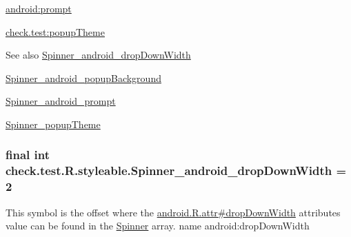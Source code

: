 {\ttfamily \hyperlink{classcheck_1_1test_1_1_r_1_1styleable_af103d6b67bae0598aa2d77310b3aab0d}{android\+:prompt}}

{\ttfamily \hyperlink{classcheck_1_1test_1_1_r_1_1styleable_a119cd6dc9855dc91a0bd24dd52b9ee01}{check.\+test\+:popup\+Theme}}

\begin{DoxySeeAlso}{See also}
\hyperlink{classcheck_1_1test_1_1_r_1_1styleable_a0f8793af1c217d7771c8d1860fa6a1e8}{Spinner\+\_\+android\+\_\+drop\+Down\+Width} 

\hyperlink{classcheck_1_1test_1_1_r_1_1styleable_af3a17f8a0e3b61c605894eed3a35f9a4}{Spinner\+\_\+android\+\_\+popup\+Background} 

\hyperlink{classcheck_1_1test_1_1_r_1_1styleable_af103d6b67bae0598aa2d77310b3aab0d}{Spinner\+\_\+android\+\_\+prompt} 

\hyperlink{classcheck_1_1test_1_1_r_1_1styleable_a119cd6dc9855dc91a0bd24dd52b9ee01}{Spinner\+\_\+popup\+Theme} 
\end{DoxySeeAlso}
\hypertarget{classcheck_1_1test_1_1_r_1_1styleable_a0f8793af1c217d7771c8d1860fa6a1e8}{}
\subsubsection[{Spinner\+\_\+android\+\_\+drop\+Down\+Width}]{\setlength{\rightskip}{0pt plus 5cm}final int check.\+test.\+R.\+styleable.\+Spinner\+\_\+android\+\_\+drop\+Down\+Width = 2\hspace{0.3cm}{\ttfamily [static]}}\label{classcheck_1_1test_1_1_r_1_1styleable_a0f8793af1c217d7771c8d1860fa6a1e8}
This symbol is the offset where the \hyperlink{}{android.\+R.\+attr\#drop\+Down\+Width} attribute\textquotesingle{}s value can be found in the \hyperlink{classcheck_1_1test_1_1_r_1_1styleable_ae9bbc621da309e840c0cacd528d5d439}{Spinner} array.  name android\+:drop\+Down\+Width \hypertarget{classcheck_1_1test_1_1_r_1_1styleable_af3a17f8a0e3b61c605894eed3a35f9a4}{}

